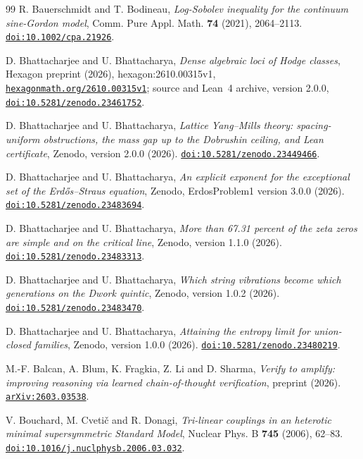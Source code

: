\begin{thebibliography}{99}
R. Bauerschmidt and T. Bodineau,
\emph{Log-Sobolev inequality for the continuum sine-Gordon model},
Comm. Pure Appl. Math. \textbf{74} (2021), 2064--2113.
\href{https://doi.org/10.1002/cpa.21926}{\nolinkurl{doi:10.1002/cpa.21926}}.

D. Bhattacharjee and U. Bhattacharya,
\emph{Dense algebraic loci of Hodge classes},
Hexagon preprint (2026), hexagon:2610.00315v1, \href{https://hexagonmath.org/2610.00315v1}{\nolinkurl{hexagonmath.org/2610.00315v1}};
source and Lean~4 archive, version 2.0.0, \href{https://doi.org/10.5281/zenodo.23461752}{\nolinkurl{doi:10.5281/zenodo.23461752}}.

D. Bhattacharjee and U. Bhattacharya,
\emph{Lattice Yang--Mills theory: spacing-uniform obstructions, the mass gap up to the Dobrushin ceiling, and Lean certificate},
Zenodo, version 2.0.0 (2026).
\href{https://doi.org/10.5281/zenodo.23449466}{\nolinkurl{doi:10.5281/zenodo.23449466}}.

D. Bhattacharjee and U. Bhattacharya,
\emph{An explicit exponent for the exceptional set of the Erd\H{o}s--Straus equation},
Zenodo, ErdosProblem1 version 3.0.0 (2026).
\href{https://doi.org/10.5281/zenodo.23483694}{\nolinkurl{doi:10.5281/zenodo.23483694}}.

D. Bhattacharjee and U. Bhattacharya,
\emph{More than 67.31 percent of the zeta zeros are simple and on the critical line},
Zenodo, version 1.1.0 (2026).
\href{https://doi.org/10.5281/zenodo.23483313}{\nolinkurl{doi:10.5281/zenodo.23483313}}.

D. Bhattacharjee and U. Bhattacharya,
\emph{Which string vibrations become which generations on the Dwork quintic},
Zenodo, version 1.0.2 (2026).
\href{https://doi.org/10.5281/zenodo.23483470}{\nolinkurl{doi:10.5281/zenodo.23483470}}.

D. Bhattacharjee and U. Bhattacharya,
\emph{Attaining the entropy limit for union-closed families},
Zenodo, version 1.0.0 (2026).
\href{https://doi.org/10.5281/zenodo.23480219}{\nolinkurl{doi:10.5281/zenodo.23480219}}.

M.-F. Balcan, A. Blum, K. Fragkia, Z. Li and D. Sharma,
\emph{Verify to amplify: improving reasoning via learned chain-of-thought verification},
preprint (2026).
\href{https://arxiv.org/abs/2603.03538}{\nolinkurl{arXiv:2603.03538}}.

V. Bouchard, M. Cveti\v{c} and R. Donagi,
\emph{Tri-linear couplings in an heterotic minimal supersymmetric Standard Model},
Nuclear Phys. B \textbf{745} (2006), 62--83.
\href{https://doi.org/10.1016/j.nuclphysb.2006.03.032}{\nolinkurl{doi:10.1016/j.nuclphysb.2006.03.032}}.


\end{thebibliography}
